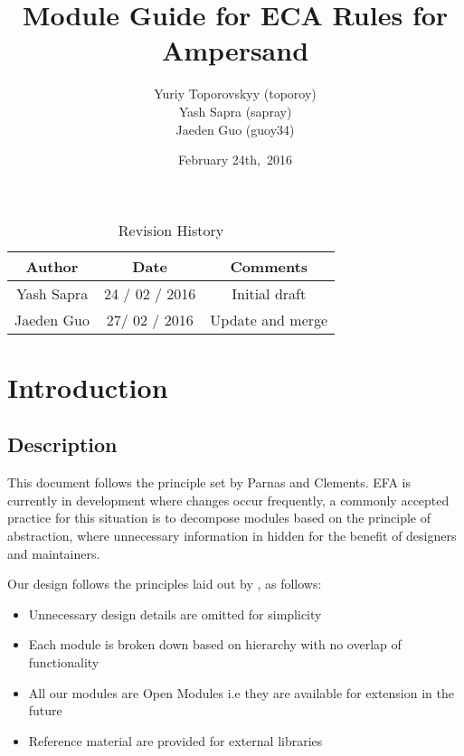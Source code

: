 \documentclass[12pt, svgnames]{article}
\begin{document}
\title{\vspace*{3cm} Module Guide for ECA Rules for Ampersand} 
\author{Yuriy Toporovskyy (toporoy)\\ Yash Sapra (sapray) \\ Jaeden Guo (guoy34)}
\date{February 24th,\ 2016} 


\maketitle
\newpage
\vspace*{1cm}
\begin{table}[ht!]\begin{center}
        \caption{Revision History}  
        \begin{tabular}{|c|c|c|}\hline
            \textbf{Author} & \textbf{Date} & \textbf{Comments} \\\hline 
            Yash Sapra & 24 / 02 / 2016 & Initial draft\\\hline
	 Jaeden Guo & 27/ 02 / 2016 & Update and merge \\\hline
        \end{tabular}
    \end{center}\end{table}
\newpage

\tableofcontents

\newpage

\section{Introduction}
\subsection{Description}
This document follows the principle set by Parnas and Clements\citep{fakeIt}. 
EFA is currently in development where changes occur frequently, a 
commonly accepted practice for this situation is to decompose modules based on 
the principle of abstraction, where unnecessary information in hidden for the 
benefit of designers and maintainers\citep{modStruct,Parnas1972}.
 

Our design follows the principles laid out by \citep{modStruct}, as follows:
\begin{itemize}
\item Unnecessary design details are omitted for simplicity
\item Each module is broken down based on hierarchy with no overlap of functionality
\item All our modules are Open Modules i.e they are available for extension in the future
\item Reference material are provided for external libraries
\end{itemize}
\end{document}
